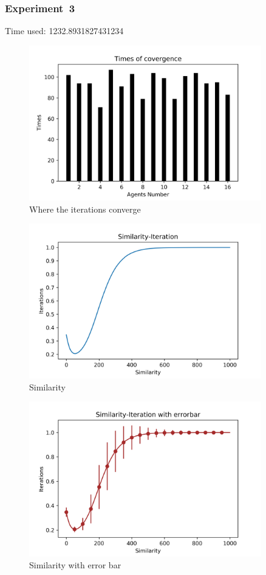 \documentclass[a4paper,12pt]{article}
\begin{document}
    \subsubsection*{Experiment~3}
    Time used: 1232.8931827431234
    \begin{figure}[H]
    	\centering
    	\includegraphics[width=0.9\textwidth]{agt50_4_1000_1500_e3}
    	\caption{Where the iterations converge}\label{agt50_4_1000_1500_e3}
    \end{figure}
    \begin{figure}[H]
    	\centering
    	\includegraphics[width=0.9\textwidth]{Sim50_4_1000_1500_e3}
    	\caption{Similarity}\label{Sim50_4_1000_1500_e3}
    \end{figure}
    \begin{figure}[H]
    	\centering
    	\includegraphics[width=0.9\textwidth]{SimErr50_4_1000_1500_e3}
    	\caption{Similarity with error bar}\label{SimErr50_4_1000_1500_e3}
    \end{figure}
\end{document}
